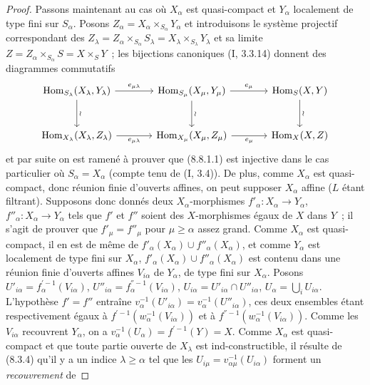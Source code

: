 \begin{proof}
Passons maintenant au cas où $X_\alpha$ est quasi-compact et $Y_\alpha$
localement de type fini sur $S_\alpha$. Posons
$Z_\alpha=X_\alpha\times_{S_\alpha}Y_\alpha$ et introduisons le système
projectif correspondant des
$Z_\lambda=Z_\alpha\times_{S_\alpha}S_\lambda=
X_\lambda\times_{S_\lambda}Y_\lambda$ et sa limite
$Z=Z_\alpha\times_{S_\alpha}S=X\times_S Y$~; les bijections canoniques
(I, 3.3.14) donnent des diagrammes commutatifs
\[
\begin{tikzcd}[column sep=large,row sep=large]
\operatorname{Hom}_{S_\lambda}(X_\lambda,Y_\lambda)
  \ar[r,"e_{\mu\lambda}"] \ar[d,"\wr"] &
\operatorname{Hom}_{S_\mu}(X_\mu,Y_\mu)
  \ar[r,"e_\mu"] \ar[d,"\wr"] &
\operatorname{Hom}_S(X,Y) \ar[d,"\wr"] \\
\operatorname{Hom}_{X_\lambda}(X_\lambda,Z_\lambda)
  \ar[r,"e_{\mu\lambda}"'] &
\operatorname{Hom}_{X_\mu}(X_\mu,Z_\mu)
  \ar[r,"e_\mu"'] &
\operatorname{Hom}_X(X,Z)
\end{tikzcd}
\]
et par suite on est ramené à prouver que (8.8.1.1) est injective dans le cas
particulier où $S_\alpha=X_\alpha$ (compte tenu de (I, 3.4)). De plus, comme
$X_\alpha$ est quasi-compact, donc réunion finie d'ouverts affines, on peut
supposer $X_\alpha$ affine ($L$ étant filtrant). Supposons donc donnés deux
$X_\alpha$-morphismes $f'_\alpha:X_\alpha\to Y_\alpha$,
$f''_\alpha:X_\alpha\to Y_\alpha$ tels que $f'$ et $f''$ soient des
$X$-morphismes égaux de $X$ dans $Y$~; il s'agit de prouver que
$f'_\mu=f''_\mu$ pour $\mu\geq\alpha$ assez grand. Comme $X_\alpha$ est
quasi-compact, il en est de même de
$f'_\alpha(X_\alpha)\cup f''_\alpha(X_\alpha)$, et comme $Y_\alpha$ est
localement de type fini sur $X_\alpha$,
$f'_\alpha(X_\alpha)\cup f''_\alpha(X_\alpha)$ est contenu dans une réunion
finie d'ouverts affines $V_{i\alpha}$ de $Y_\alpha$, de type fini sur
$X_\alpha$. Posons
$U'_{i\alpha}=f_\alpha^{'-1}(V_{i\alpha})$,
$U''_{i\alpha}=f_\alpha^{''-1}(V_{i\alpha})$,
$U_{i\alpha}=U'_{i\alpha}\cap U''_{i\alpha}$,
$U_\alpha=\bigcup_iU_{i\alpha}$. L'hypothèse $f'=f''$ entraîne
$v_\alpha^{-1}(U'_{i\alpha})=v_\alpha^{-1}(U''_{i\alpha})$, ces deux ensembles
étant respectivement égaux à $f^{'-1}(w_\alpha^{-1}(V_{i\alpha}))$ et à
$f^{''-1}(w_\alpha^{-1}(V_{i\alpha}))$. Comme les $V_{i\alpha}$ recouvrent
$Y_\alpha$, on a $v_\alpha^{-1}(U_\alpha)=f^{'-1}(Y)=X$. Comme $X_\alpha$
est quasi-compact et que toute partie ouverte de $X_\lambda$ est
ind-constructible, il résulte de (8.3.4) qu'il y a un indice
$\lambda\geq\alpha$ tel que les
$U_{i\mu}=v_{\alpha\mu}^{-1}(U_{i\alpha})$ forment un \emph{recouvrement} de

\end{proof}
